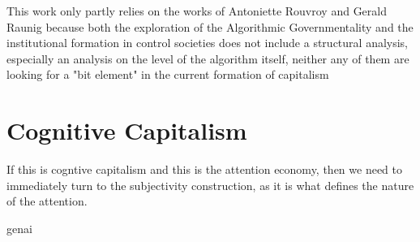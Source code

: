 This work only partly relies on the works of Antoniette Rouvroy
and Gerald Raunig
because both the exploration of the Algorithmic Governmentality and the
institutional formation in control societies does not include a structural
analysis, especially an analysis on the level of the algorithm itself,
neither any of them are looking for a "bit element" in the current formation of
capitalism



\section{Cognitive Capitalism}
If this is cogntive capitalism and this is the attention economy, then we need
to immediately turn to the subjectivity construction, as it is what defines the
nature of the attention.

\gls{genai}


